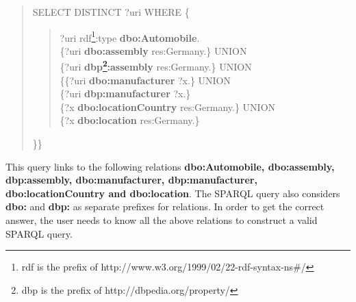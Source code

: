 \begin{sloppypar}
\begin{enumerate}
\begin{quote}
{\selectfont SELECT DISTINCT ?uri WHERE \{}
\begin{quote}
{\selectfont
?uri rdf\footnote{rdf is the prefix of http://www.w3.org/1999/02/22-rdf-syntax-ns\#/}:type \textbf{dbo:Automobile}. \\ \{?uri \textbf{dbo:assembly} res:Germany.\} UNION  \\ \{?uri \textbf{dbp\footnote{dbp is the prefix of http://dbpedia.org/property/}:assembly} res:Germany.\} UNION \\ \{\{?uri \textbf{dbo:manufacturer} ?x.\} UNION \\ \{?uri \textbf{dbp:manufacturer} ?x.\} \\ \{?x \textbf{dbo:locationCountry} res:Germany.\} UNION \\ \{?x \textbf{dbo:location} res:Germany.\}
} 
\end{quote}
{\selectfont\}\}}
\end{quote}

This query links to the following relations \textbf{dbo:Automobile, dbo:assembly, dbp:assembly, dbo:manufacturer, dbp:manufacturer, dbo:locationCountry and dbo:location}. The SPARQL query also considers \textbf{dbo:} and \textbf{dbp:} as separate prefixes for relations. In order to get the correct answer, the user needs to know all the above relations to construct a valid SPARQL query.
\end{enumerate}


\end{sloppypar}
